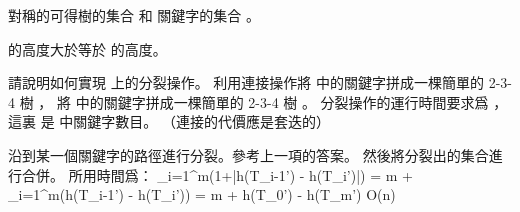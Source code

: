 對稱的可得樹的集合  和
關鍵字的集合 。

 的高度大於等於  的高度。
\stopANSWER

\startigBase[continue]\startitem
請說明如何實現  上的分裂操作。
利用連接操作將  中的關鍵字拼成一棵簡單的 2-3-4 樹 ，
將  中的關鍵字拼成一棵簡單的 2-3-4 樹 。
分裂操作的運行時間要求爲 ，
這裏  是  中關鍵字數目。
（\hint 連接的代價應是套迭的）
\stopitem\stopigBase

\startANSWER
沿到某一個關鍵字的路徑進行分裂。參考上一項的答案。
然後將分裂出的集合進行合併。
所用時間爲：
\startformula
\sum_{i=1}^{m}(1+|h(T_{i-1}') - h(T_i')|)
= m + \sum_{i=1}^{m}(h(T_{i-1}') - h(T_i'))
= m + h(T_0') - h(T_m')
\in O(\lg n)
\stopformula
\stopANSWER

\stopPROBLEM

\stopsubject%
